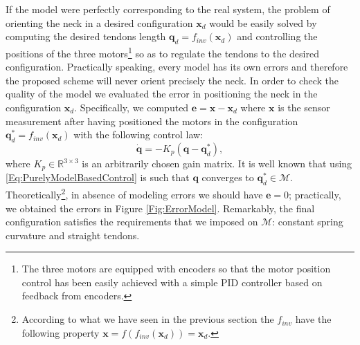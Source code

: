 \documentclass[conference]{IEEEtran}
\numberwithin{equation}{section}
\newcommand{\q}{\mathbf{q}}
\newcommand{\x}{\mathbf{x}}
\begin{document}
If the model were perfectly corresponding to the real system, the problem of orienting the neck in a desired configuration $\x_d$ would be easily solved by computing the desired tendons length $\q_d = f_{inv} (\x_d)$ and controlling the positions of the three motors\footnote{The three motors are equipped with encoders so that the motor position control has been easily achieved with a simple PID controller based on feedback from encoders.} so as to regulate the tendons to the desired configuration. Practically speaking, every model has its own errors and therefore the proposed scheme will never orient precisely the neck. In order to check the quality of the model we evaluated the error in positioning the neck in the configuration $\x_d$. Specifically, we computed $\mathbf e = \x - \x_d$ where $\x$ is the sensor measurement after having positioned the motors in the configuration $\q^*_d = f_{inv}(\x_d)$ with the following control law:
\begin{equation} \label{Eq:PurelyModelBasedControl}
\dot{\q} = - K_p (\q - \q^*_d),
\end{equation}
where $K_p \in \mathbb R^{3 \times 3}$ is an arbitrarily chosen gain matrix. It is well known that using \eqref{Eq:PurelyModelBasedControl} is such that $\q$ converges to $\q^*_d \in \mathcal M$. Theoretically\footnote{According to what we have seen in the previous section the $f_{inv}$ have the following property $\x = f(f_{inv} (\x_d)) = \x_d$.}, in absence of modeling errors we should have $\mathbf e = 0$; practically, we obtained the errors in Figure \ref{Fig:ErrorModel}. Remarkably, the final configuration satisfies the requirements that we imposed on $\mathcal M$: constant spring curvature and straight tendons. 
\end{document}
